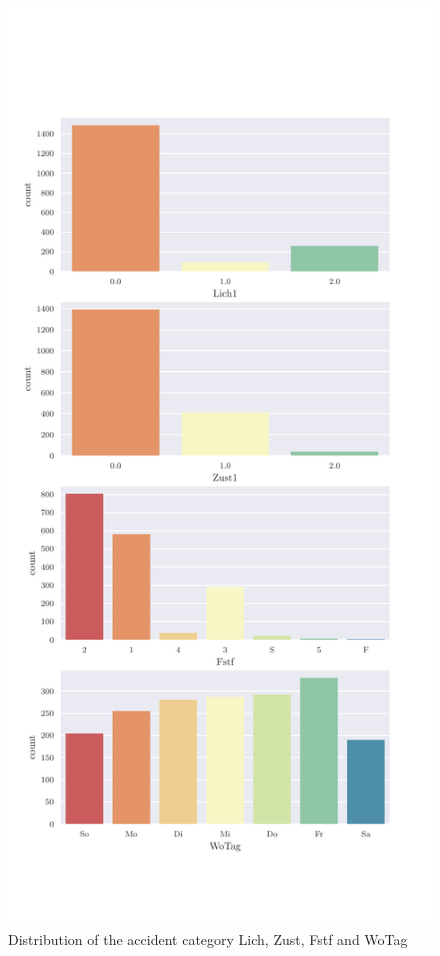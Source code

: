     \begin{figure}[ht!]
        \centering
        \includegraphics[scale=0.7]{CorrAnalysis/data/BAYSIS/02_matched/plots/baysis_matched_count_multiple03}
        \caption{Distribution of the accident category Lich, Zust, Fstf and WoTag}
        \label{img:baysis_matched_Lich}
        \label{img:baysis_matched_Zust}
        \label{img:baysis_matched_Fstf}
        \label{img:baysis_matched_WoTag}
    \end{figure}

